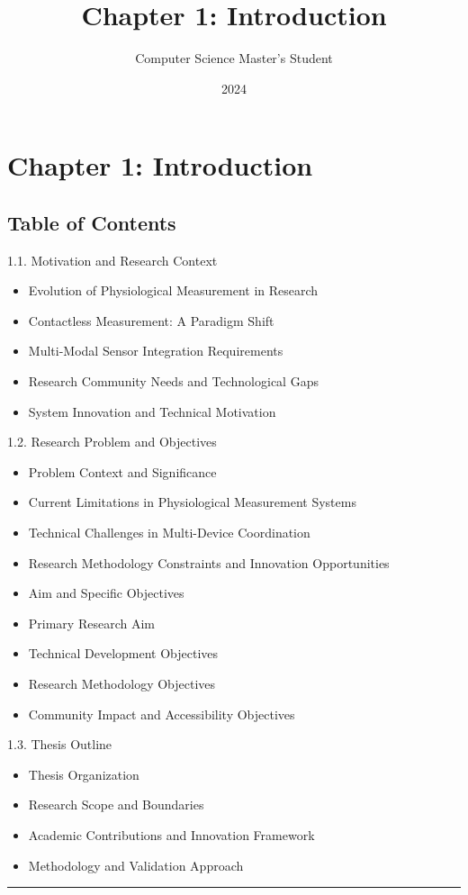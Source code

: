 \documentclass[11pt,a4paper]{article}
\title{Chapter 1: Introduction}
\author{Computer Science Master's Student}
\date{2024}
\begin{document}
\maketitle

\section{Chapter 1: Introduction}

\subsection{Table of Contents}

1.1. Motivation and Research Context

\begin{itemize}
\item Evolution of Physiological Measurement in Research
\item Contactless Measurement: A Paradigm Shift
\item Multi-Modal Sensor Integration Requirements
\item Research Community Needs and Technological Gaps
\item System Innovation and Technical Motivation

\end{itemize}
1.2. Research Problem and Objectives

\begin{itemize}
\item Problem Context and Significance
\item Current Limitations in Physiological Measurement Systems
\item Technical Challenges in Multi-Device Coordination
\item Research Methodology Constraints and Innovation Opportunities
\item Aim and Specific Objectives
\item Primary Research Aim
\item Technical Development Objectives
\item Research Methodology Objectives
\item Community Impact and Accessibility Objectives

\end{itemize}
1.3. Thesis Outline

\begin{itemize}
\item Thesis Organization
\item Research Scope and Boundaries
\item Academic Contributions and Innovation Framework
\item Methodology and Validation Approach

\end{itemize}
\hrule
\end{document}
